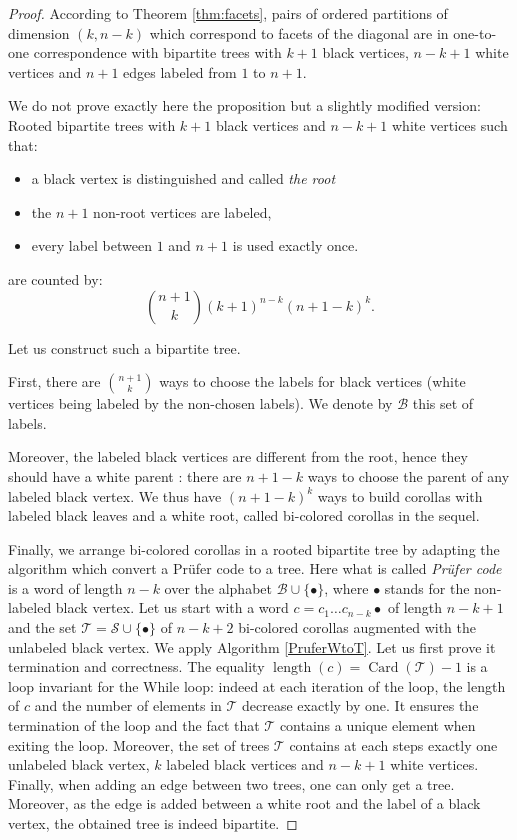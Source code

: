 \begin{proof}
According to Theorem \cref{thm:facets}, pairs of ordered partitions of dimension $(k,n-k)$ which correspond to facets of the diagonal are in one-to-one correspondence with bipartite trees with $k+1$ black vertices, $n-k+1$ white vertices and $n+1$ edges labeled from $1$ to $n+1$.

We do not prove exactly here the proposition but a slightly modified version: 
Rooted bipartite trees with $k+1$ black vertices and $n-k+1$ white vertices such that:
\begin{itemize}
\item a black vertex is distinguished and called \emph{the root}
\item the $n+1$ non-root vertices are labeled,
\item every label between $1$ and $n+1$ is used exactly once.
\end{itemize}
are counted by:
\begin{equation}
\binom{n+1}{k}(k+1)^{n-k}(n+1-k)^{k}.
\end{equation}

Let us construct such a bipartite tree. 

First, there are $\binom{n+1}{k}$ ways to  choose the labels for black vertices (white vertices being labeled by the non-chosen labels). 
We denote by $\mathcal{B}$ this set of labels.

Moreover, the labeled black vertices are different from the root, hence they should have a white parent : there are $n+1-k$ ways to choose the parent of any labeled black vertex. 
We thus have  $(n+1-k)^{k}$ ways to build corollas with labeled black leaves and a white root, called bi-colored corollas in the sequel.

Finally, we arrange bi-colored corollas in a rooted bipartite tree by adapting the algorithm which convert a Prüfer code to a tree. 
Here what is called \emph{Prüfer code} is a word of length $n-k$ over the alphabet $\mathcal{B} \cup \{\bullet\}$, where $\bullet$ stands for the non-labeled black vertex. 
Let us start with a word $c=c_1 \ldots c_{n-k} \bullet$ of length $n-k+1$ and the set $\mathcal{T}=\mathcal{S} \cup \{\bullet\}$ of $n-k+2$ bi-colored corollas augmented with the unlabeled black vertex. 
We apply Algorithm \ref{PruferWtoT}. Let us first prove it termination and correctness. The equality 
$\operatorname{length}(c)=\operatorname{Card}(\mathcal{T})-1$ is a loop invariant for the While loop: indeed at each iteration of the loop, the length of $c$ and the number of elements in $\mathcal{T}$ decrease exactly by one. It ensures the termination of the loop and the fact that $\mathcal{T}$ contains a unique element when exiting the loop. Moreover, the set of trees $\mathcal{T}$ contains at each steps exactly one unlabeled black vertex, $k$ labeled black vertices and $n-k+1$ white vertices. Finally, when adding an edge between two trees, one can only get a tree. Moreover, as the edge is added between a white root and the label of a black vertex, the obtained tree is indeed bipartite.


\end{proof}
